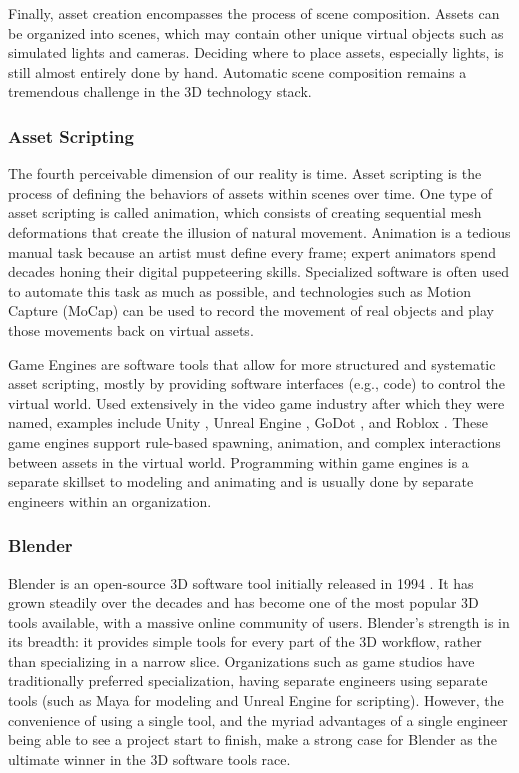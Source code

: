 \documentclass{article}
\begin{document}
Finally, asset creation encompasses the process of scene composition. Assets can be organized into scenes, which may contain other unique virtual objects such as simulated lights and cameras. Deciding where to place assets, especially lights, is still almost entirely done by hand. Automatic scene composition remains a tremendous challenge in the 3D technology stack.

\subsubsection{Asset Scripting}
\label{sec:assetscripting}

The fourth perceivable dimension of our reality is time. Asset scripting is the process of defining the behaviors of assets within scenes over time. One type of asset scripting is called animation, which consists of creating sequential mesh deformations that create the illusion of natural movement. Animation is a tedious manual task because an artist must define every frame; expert animators spend decades honing their digital puppeteering skills. Specialized software is often used to automate this task as much as possible, and technologies such as Motion Capture (MoCap) can be used to record the movement of real objects and play those movements back on virtual assets.

Game Engines are software tools that allow for more structured and systematic asset scripting, mostly by providing software interfaces (e.g., code) to control the virtual world. Used extensively in the video game industry after which they were named, examples include Unity \citep{unity3d}, Unreal Engine \citep{unrealengine}, GoDot \citep{godot}, and Roblox \citep{roblox}. These game engines support rule-based spawning, animation, and complex interactions between assets in the virtual world. Programming within game engines is a separate skillset to modeling and animating and is usually done by separate engineers within an organization.

\subsubsection{Blender}
\label{sec:blender}

Blender is an open-source 3D software tool initially released in 1994 \citep{blender}. It has grown steadily over the decades and has become one of the most popular 3D tools available, with a massive online community of users. Blender’s strength is in its breadth: it provides simple tools for every part of the 3D workflow, rather than specializing in a narrow slice. Organizations such as game studios have traditionally preferred specialization, having separate engineers using separate tools (such as Maya for modeling and Unreal Engine for scripting). However, the convenience of using a single tool, and the myriad advantages of a single engineer being able to see a project start to finish, make a strong case for Blender as the ultimate winner in the 3D software tools race. 
\end{document}
